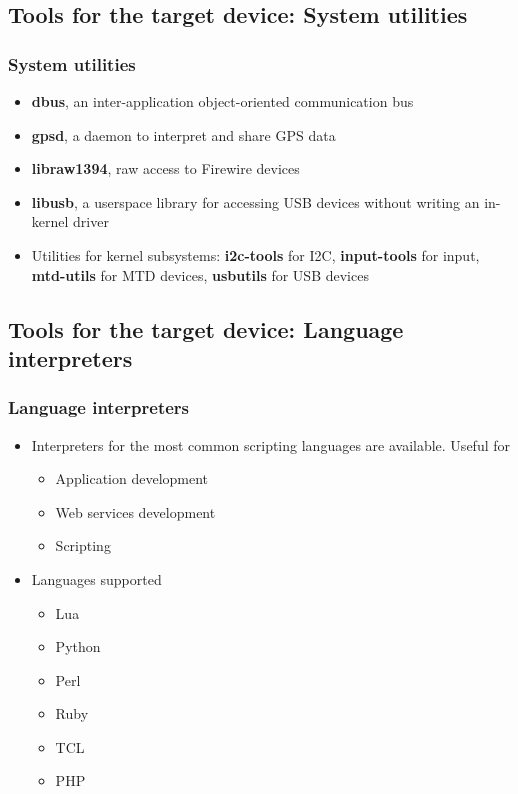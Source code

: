 \subsection[System utilities]{Tools for the target device: System
  utilities}

\begin{frame}
  \frametitle{System utilities}
  \begin{itemize}
  \item {\bf dbus}, an inter-application object-oriented communication bus
  \item {\bf gpsd}, a daemon to interpret and share GPS data
  \item {\bf libraw1394}, raw access to Firewire devices
  \item {\bf libusb}, a userspace library for accessing USB devices
    without writing an in-kernel driver
  \item Utilities for kernel subsystems: {\bf i2c-tools} for I2C, {\bf
      input-tools} for input, {\bf mtd-utils} for MTD devices, {\bf
      usbutils} for USB devices
  \end{itemize}
\end{frame}

\subsection[Language Interpreters]{Tools for the target device:
  Language interpreters}

\begin{frame}
  \frametitle{Language interpreters}
  \begin{itemize}
  \item Interpreters for the most common scripting languages are
    available. Useful for
    \begin{itemize}
    \item Application development
    \item Web services development
    \item Scripting
    \end{itemize}
  \item Languages supported
    \begin{itemize}
    \item Lua
    \item Python
    \item Perl
    \item Ruby
    \item TCL
    \item PHP
    \end{itemize}
  \end{itemize}
\end{frame}


